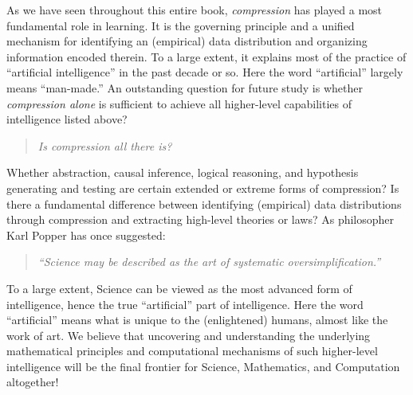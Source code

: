 \documentclass[../../book-main.tex]{subfiles}
\begin{document}
As we have seen throughout this entire book, {\em compression} has played a most fundamental role in learning. It is the governing principle and a unified mechanism for identifying an (empirical) data distribution and organizing information encoded therein. To a large extent, it explains most of the practice of ``artificial intelligence'' in the past decade or so. Here the word ``artificial'' largely means ``man-made.'' An outstanding question for future study is whether {\em compression alone} is sufficient to achieve all higher-level capabilities of intelligence listed above? 
\begin{quote}
\begin{center}
        {\em Is compression all there is?}
\end{center}
\end{quote}
Whether abstraction, causal inference, logical reasoning, and hypothesis generating and testing are certain extended or extreme forms of compression? Is there a fundamental difference between identifying (empirical) data distributions through compression and extracting high-level theories or laws?  As philosopher Karl Popper has once suggested:
\begin{quote}
    \begin{center}
    {\em ``Science may be described as the art of systematic oversimplification.''}
    \end{center}
\end{quote}
To a large extent, Science can be viewed as the most advanced form of intelligence, hence the true ``artificial'' part of intelligence. Here the word ``artificial'' means what is unique to the (enlightened) humans, almost like the work of art. We believe that uncovering and understanding the underlying mathematical principles and computational mechanisms of such higher-level intelligence will be the final frontier for Science, Mathematics, and Computation altogether!
\end{document}
